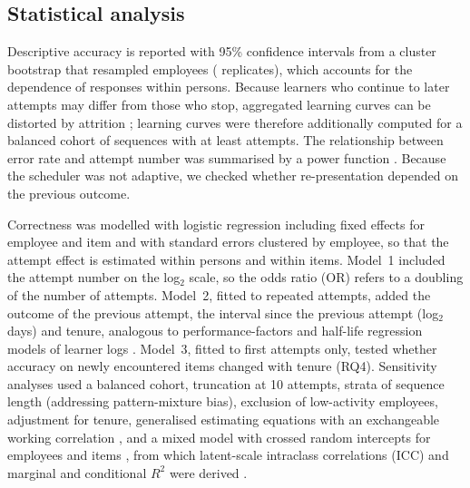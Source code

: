 \subsection{Statistical analysis}
Descriptive accuracy is reported with 95\% confidence intervals from a cluster bootstrap that
resampled employees (\BootReps{} replicates), which accounts for the dependence of responses within
persons. Because learners who continue to later attempts may differ from those who stop, aggregated
learning curves can be distorted by attrition \citep{murray2013,goutte2018}; learning curves were
therefore additionally computed for a balanced cohort of sequences with at least \CohortK{}
attempts. The relationship between error rate and attempt number was summarised by a power function
\citep{newell1981}. Because the scheduler was not adaptive, we checked whether re-presentation
depended on the previous outcome.

Correctness was modelled with logistic regression including fixed effects for employee and item and
with standard errors clustered by employee, so that the attempt effect is estimated within persons
and within items. Model~1 included the attempt number on the log$_2$ scale, so the odds ratio (OR)
refers to a doubling of the number of attempts. Model~2, fitted to repeated attempts, added the
outcome of the previous attempt, the interval since the previous attempt (log$_2$ days) and tenure,
analogous to performance-factors and half-life regression models of learner logs
\citep{pavlik2009,settles2016}. Model~3, fitted to first attempts only, tested whether accuracy on
newly encountered items changed with tenure (RQ4). Sensitivity analyses used a balanced cohort,
truncation at 10 attempts, strata of sequence length (addressing pattern-mixture bias), exclusion of
low-activity employees, adjustment for tenure, generalised estimating equations with an
exchangeable working correlation \citep{liang1986}, and a mixed model with crossed random
intercepts for employees and items \citep{baayen2008}, from which latent-scale intraclass
correlations (ICC) and marginal and conditional $R^2$ were derived \citep{nakagawa2013}.

